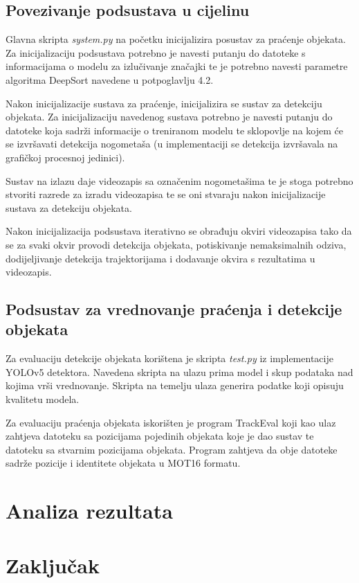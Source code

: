 \documentclass[times, utf8, seminar, numeric]{fer}
\begin{document}
\section{Povezivanje podsustava u cijelinu}

Glavna skripta \textit{system.py} na početku inicijalizira posustav za praćenje objekata. Za inicijalizaciju podsustava potrebno je navesti putanju do datoteke s informacijama o modelu za izlučivanje značajki te je potrebno navesti parametre algoritma DeepSort navedene u potpoglavlju 4.2.

Nakon inicijalizacije sustava za praćenje, inicijalizira se sustav za detekciju objekata. Za inicijalizaciju navedenog sustava potrebno je navesti putanju do datoteke koja sadrži informacije o treniranom modelu te sklopovlje na kojem će se izvršavati detekcija nogometaša (u implementaciji se detekcija izvršavala na grafičkoj procesnoj jedinici).

Sustav na izlazu daje videozapis sa označenim nogometašima te je stoga potrebno stvoriti razrede za izradu videozapisa te se oni stvaraju nakon inicijalizacije sustava za detekciju objekata.

Nakon inicijalizacija podsustava iterativno se obrađuju okviri videozapisa tako da se za svaki okvir provodi detekcija objekata, potiskivanje nemaksimalnih odziva, dodijeljivanje detekcija trajektorijama i dodavanje okvira s rezultatima u videozapis.

\section{Podsustav za vrednovanje praćenja i detekcije objekata}

Za evaluaciju detekcije objekata korištena je skripta \textit{test.py} iz implementacije YOLOv5 detektora. Navedena skripta na ulazu prima model i skup podataka nad kojima vrši vrednovanje. Skripta na temelju ulaza generira podatke koji opisuju kvalitetu modela.

Za evaluaciju praćenja objekata iskorišten je program TrackEval koji kao ulaz zahtjeva datoteku sa pozicijama pojedinih objekata koje je dao sustav te datoteku sa stvarnim pozicijama objekata. Program zahtjeva da obje datoteke sadrže pozicije i identitete objekata u MOT16 formatu.



\chapter{Analiza rezultata}

\chapter{Zaključak}




\end{document}
